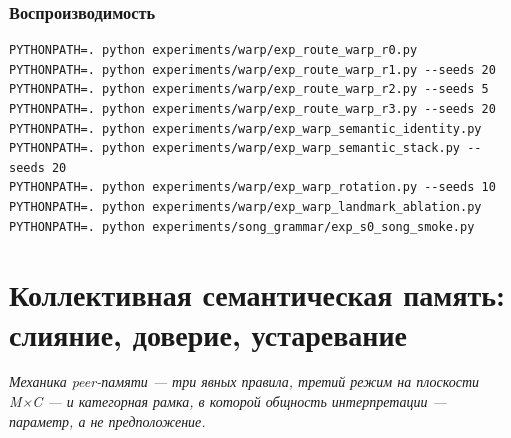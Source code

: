 \documentclass{article}
\begin{document}
\section{Воспроизводимость}
\label{p3:app:repro}
\begin{verbatim}
PYTHONPATH=. python experiments/warp/exp_route_warp_r0.py
PYTHONPATH=. python experiments/warp/exp_route_warp_r1.py --seeds 20
PYTHONPATH=. python experiments/warp/exp_route_warp_r2.py --seeds 5
PYTHONPATH=. python experiments/warp/exp_route_warp_r3.py --seeds 20
PYTHONPATH=. python experiments/warp/exp_warp_semantic_identity.py
PYTHONPATH=. python experiments/warp/exp_warp_semantic_stack.py --seeds 20
PYTHONPATH=. python experiments/warp/exp_warp_rotation.py --seeds 10
PYTHONPATH=. python experiments/warp/exp_warp_landmark_ablation.py
PYTHONPATH=. python experiments/song_grammar/exp_s0_song_smoke.py
\end{verbatim}
\FloatBarrier

\clearpage
\part{Коллективная семантическая память: слияние, доверие, устаревание}
\noindent\textit{Механика peer-памяти — три явных правила, третий режим на плоскости M×C — и категорная рамка, в которой общность интерпретации — параметр, а не предположение.}
\end{document}
